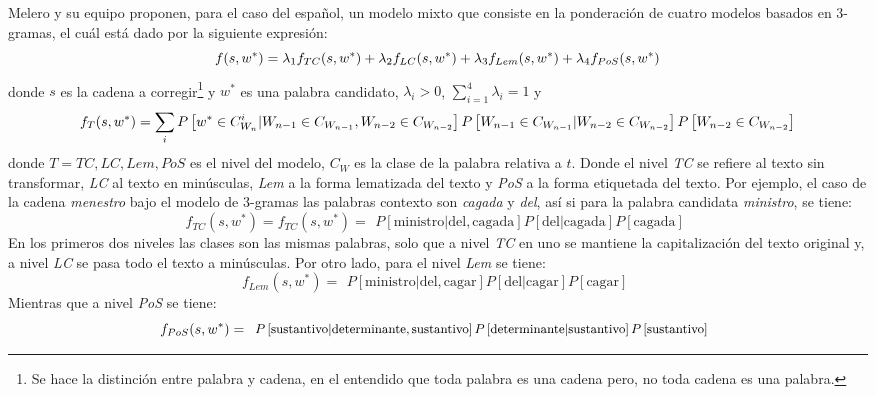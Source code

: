Melero y su equipo proponen, para el caso del español, un modelo mixto que consiste en la ponderación de cuatro modelos basados en 3-gramas, el cuál está dado por la siguiente expresión:
\begin{equation}
	\label{eq:melero1}
	\small
	f(s,w^{*}) = \lambda_1f_{TC}(s,w^{*}) + \lambda_2f_{LC}(s,w^{*}) + \lambda_3f_{Lem}(s,w^{*}) + \lambda_4f_{PoS}(s,w^{*})
\end{equation}
donde $s$ es la cadena a corregir\footnote{Se hace la distinción entre palabra y cadena, en el entendido que toda palabra es una cadena pero, no toda cadena es una palabra.} y $w^{*}$ es una palabra candidato, $\lambda_i>0$, $\sum_{i=1}^{4}\lambda_i = 1$ y 
\begin{equation}
	\tiny
	f_{T}(s,w^{*}) = \sum_{i} P\left[w^{*} \in C_{W_n}^i\vert W_{n-1} \in C_{W_{n-1}},W_{n-2} \in C_{W_{n-2}}\right]P\left[W_{n-1} \in C_{W_{n-1}} \vert W_{n-2} \in C_{W_{n-2}}\right]P\left[W_{n-2} \in C_{W_{n-2}}\right]
\end{equation}
donde $T=TC, LC, Lem, PoS$ es el nivel del modelo, $C_{W}$ es la clase de la palabra relativa a $t$. Donde el nivel \textit{TC} se refiere al texto sin transformar, \textit{LC} al texto en minúsculas, \textit{Lem} a la forma lematizada del texto y \textit{PoS} a la forma etiquetada del texto. Por ejemplo, el caso de la cadena \textit{menestro} bajo el modelo de 3-gramas las palabras contexto son \textit{cagada} y \textit{del}, así si para la palabra candidata \textit{ministro}, se tiene: 
$$f_{TC}(s,w^{*}) = f_{TC}(s,w^{*}) = \begin{array}{c}
	P\left[\mbox{ministro} \vert \mbox{del}, \mbox{cagada}\right]	P\left[\mbox{del} \vert \mbox{cagada}\right]P\left[\mbox{cagada}\right]
\end{array}$$
En los primeros dos niveles las clases son las mismas palabras, solo que a nivel \textit{TC} en uno se mantiene la capitalización del texto original y, a nivel \textit{LC} se pasa todo el texto a minúsculas. Por otro lado, para el nivel \textit{Lem} se tiene:
$$f_{Lem}(s,w^{*}) = \begin{array}{c}
	P\left[\mbox{ministro} \vert \mbox{del}, \mbox{cagar}\right]	P\left[\mbox{del} \vert \mbox{cagar}\right]P\left[\mbox{cagar}\right]
\end{array}$$
Mientras que a nivel \textit{PoS} se tiene:
$$\small f_{PoS}(s,w^{*}) = \begin{array}{c}
	P\left[\mbox{sustantivo} \vert \mbox{determinante}, \mbox{sustantivo}\right]	P\left[\mbox{determinante} \vert \mbox{sustantivo}\right]P\left[\mbox{sustantivo}\right]
\end{array}$$

